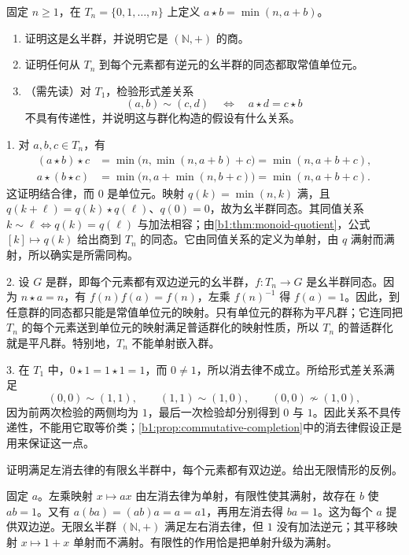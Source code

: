 \begin{exercise}\label{b1:ex:01-truncated-addition}
	固定 \(n\geq1\)，在 \(T_n=\{0,1,\ldots,n\}\) 上定义 \(a\star b=\min(n,a+b)\)。
	\begin{enumerate}
		\item 证明这是幺半群，并说明它是 \((\mathbb N,+)\) 的商。
		\item 证明任何从 \(T_n\) 到每个元素都有逆元的幺半群的同态都取常值单位元。
		\item （需先读）对 \(T_1\)，检验形式差关系
			\[
				(a,b)\sim(c,d)\quad\Longleftrightarrow\quad a\star d=c\star b
			\]
			不具有传递性，并说明这与群化构造的假设有什么关系。
	\end{enumerate}
\end{exercise}
\begin{solution}
	1. 对 \(a,b,c\in T_n\)，有
	\[
		\begin{aligned}
			(a\star b)\star c &=\min\bigl(n,\min(n,a+b)+c\bigr) =\min(n,a+b+c),\\
			a\star(b\star c) &=\min\bigl(n,a+\min(n,b+c)\bigr) =\min(n,a+b+c).
		\end{aligned}
	\]
	这证明结合律，而 \(0\) 是单位元。映射 \(q(k)=\min(n,k)\) 满，且 \(q(k+\ell)=q(k)\star q(\ell)\)、\(q(0)=0\)，故为幺半群同态。其同值关系 \(k\sim\ell\Longleftrightarrow q(k)=q(\ell)\) 与加法相容；由\cref{b1:thm:monoid-quotient}，公式 \([k]\mapsto q(k)\) 给出商到 \(T_n\) 的同态。它由同值关系的定义为单射，由 \(q\) 满射而满射，所以确实是所需同构。

	2. 设 \(G\) 是群，即每个元素都有双边逆元的幺半群，\(f:T_n\rightarrow G\) 是幺半群同态。因为 \(n\star a=n\)，有 \(f(n)f(a)=f(n)\)，左乘 \(f(n)^{-1}\) 得 \(f(a)=1\)。因此，到任意群的同态都只能是常值单位元的映射。只有单位元的群称为平凡群；它连同把 \(T_n\) 的每个元素送到单位元的映射满足普适群化的映射性质，所以 \(T_n\) 的普适群化就是平凡群。特别地，\(T_n\) 不能单射嵌入群。

	3. 在 \(T_1\) 中，\(0\star1=1\star1=1\)，而 \(0\ne1\)，所以消去律不成立。所给形式差关系满足
	\[
		(0,0)\sim(1,1),\qquad (1,1)\sim(1,0),\qquad (0,0)\not\sim(1,0),
	\]
	因为前两次检验的两侧均为 \(1\)，最后一次检验却分别得到 \(0\) 与 \(1\)。因此关系不具传递性，不能用它取等价类；\cref{b1:prop:commutative-completion}中的消去律假设正是用来保证这一点。
\end{solution}

\begin{exercise}\label{b1:ex:01-finite-cancellation}
	证明满足左消去律的有限幺半群中，每个元素都有双边逆。给出无限情形的反例。
\end{exercise}
\begin{solution}
	固定 \(a\)。左乘映射 \(x\mapsto ax\) 由左消去律为单射，有限性使其满射，故存在 \(b\) 使 \(ab=1\)。又有 \(a(ba)=(ab)a=a=a1\)，再用左消去得 \(ba=1\)。这为每个 \(a\) 提供双边逆。无限幺半群 \((\mathbb N,+)\) 满足左右消去律，但 \(1\) 没有加法逆元；其平移映射 \(x\mapsto1+x\) 单射而不满射。有限性的作用恰是把单射升级为满射。
\end{solution}


